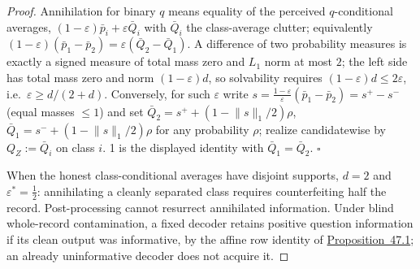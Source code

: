 \begin{proof}

Annihilation for binary \(q\) means equality of the perceived \(q\)-conditional averages, \((1-\varepsilon)\bar p_i + \varepsilon \bar Q_i\) with \(\bar Q_i\) the class-average clutter; equivalently \((1-\varepsilon)(\bar p_1 - \bar p_2) = \varepsilon(\bar Q_2 - \bar Q_1)\). A difference of two probability measures is exactly a signed measure of total mass zero and \(L_1\) norm at most \(2\); the left side has total mass zero and norm \((1-\varepsilon)d\), so solvability requires \((1-\varepsilon)d \le 2\varepsilon\), i.e.~\(\varepsilon \ge d/(2+d)\). Conversely, for such \(\varepsilon\) write \(s = \tfrac{1-\varepsilon}{\varepsilon}(\bar p_1 - \bar p_2) = s^+ - s^-\) (equal masses \(\le 1\)) and set \(\bar Q_2 = s^+ + (1 - \lVert s\rVert_1/2)\rho\), \(\bar Q_1 = s^- + (1 - \lVert s\rVert_1/2)\rho\) for any probability \(\rho\); realize candidatewise by \(Q_Z := \bar Q_i\) on class \(i\). 1 is the displayed identity with \(\bar Q_1 = \bar Q_2\). \(\square\)

When the honest class-conditional averages have disjoint supports, \(d = 2\) and \(\varepsilon^* = \tfrac12\): annihilating a cleanly separated class requires counterfeiting half the record. Post-processing cannot resurrect annihilated information. Under blind whole-record contamination, a fixed decoder retains positive question information if its clean output was informative, by the affine row identity of \hyperlink{stmt:47.1}{Proposition~47.1}; an already uninformative decoder does not acquire it.
\end{proof}

